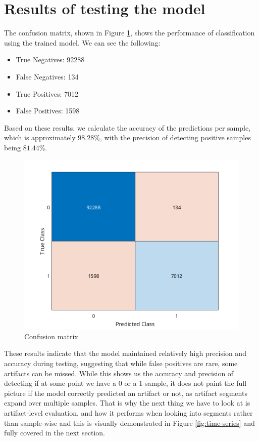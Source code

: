 \documentclass[12pt,a4paper,titlepage,openany]{report}
\begin{document}
\section{Results of testing the model}

The confusion matrix, shown in Figure \ref{fig:confusion-matrix}, shows the performance of classification using the trained model. We can see the following:
\begin{itemize}
    \item True Negatives: 92288
    \item False Negatives: 134
    \item True Positives: 7012
    \item False Positives: 1598
\end{itemize}

Based on these results, we calculate the accuracy of the predictions per sample, which is approximately \(98.28\%\), with the precision of detecting positive samples being \(81.44\%\). 

\begin{figure}[H]
    \includegraphics[width=1\linewidth]{./new_training/training_test_data_confusion_chart_new.png}
    \caption{Confusion matrix}
    \label{fig:confusion-matrix}
\end{figure}

These results indicate that the model maintained relatively high precision and accuracy during testing, suggesting that while false positives are rare, some artifacts can be missed. While this shows us the accuracy and precision of detecting if at some point we have a 0 or a 1 sample, it does not paint the full picture if the model correctly predicted an artifact or not, as artifact segments expand over multiple samples. That is why the next thing we have to look at is artifact-level evaluation, and how it performs when looking into segments rather than sample-wise and this is visually demonstrated in Figure \ref{fig:time-series} and fully covered in the next section.
\end{document}
